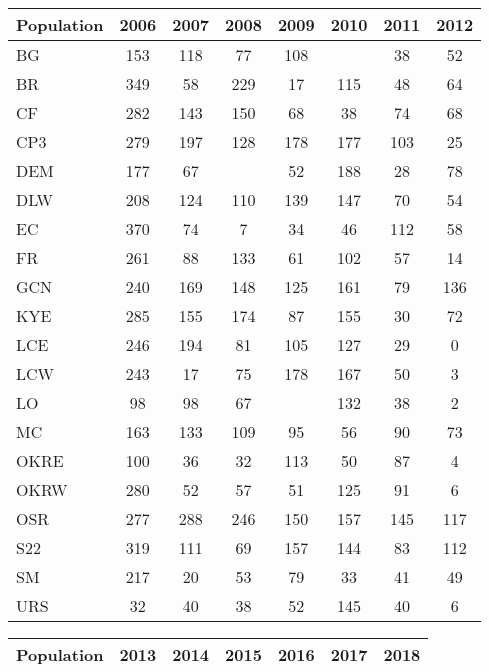 \documentclass[12pt, oneside, titlepage]{article}   	%
\begin{document}
 \label{tab:sigma} 
\begin{table}[ht]
\centering
\begin{tabular}{lccccccc}
  \hline
Population & 2006 & 2007 & 2008 & 2009 & 2010 & 2011 & 2012 \\ 
  \hline
BG & 153 & 118 &  77 & 108 &  &  38 &  52 \\ 
  BR & 349 &  58 & 229 &  17 & 115 &  48 &  64 \\ 
  CF & 282 & 143 & 150 &  68 &  38 &  74 &  68 \\ 
  CP3 & 279 & 197 & 128 & 178 & 177 & 103 &  25 \\ 
  DEM & 177 &  67 &  &  52 & 188 &  28 &  78 \\ 
  DLW & 208 & 124 & 110 & 139 & 147 &  70 &  54 \\ 
  EC & 370 &  74 &   7 &  34 &  46 & 112 &  58 \\ 
  FR & 261 &  88 & 133 &  61 & 102 &  57 &  14 \\ 
  GCN & 240 & 169 & 148 & 125 & 161 &  79 & 136 \\ 
  KYE & 285 & 155 & 174 &  87 & 155 &  30 &  72 \\ 
  LCE & 246 & 194 &  81 & 105 & 127 &  29 &   0 \\ 
  LCW & 243 &  17 &  75 & 178 & 167 &  50 &   3 \\ 
  LO &  98 &  98 &  67 &  & 132 &  38 &   2 \\ 
  MC & 163 & 133 & 109 &  95 &  56 &  90 &  73 \\ 
  OKRE & 100 &  36 &  32 & 113 &  50 &  87 &   4 \\ 
  OKRW & 280 &  52 &  57 &  51 & 125 &  91 &   6 \\ 
  OSR & 277 & 288 & 246 & 150 & 157 & 145 & 117 \\ 
  S22 & 319 & 111 &  69 & 157 & 144 &  83 & 112 \\ 
  SM & 217 &  20 &  53 &  79 &  33 &  41 &  49 \\ 
  URS &  32 &  40 &  38 &  52 & 145 &  40 &   6 \\ 
   \hline
\end{tabular}
\end{table}

  \newpage
 
  \label{tab:sigma} 
\begin{table}[ht]
\centering
\begin{tabular}{lcccccc}
  \hline
Population & 2013 & 2014 & 2015 & 2016 & 2017 & 2018 \\ 
  \hline

     \hline
\end{tabular}
\end{table}
\end{document}
